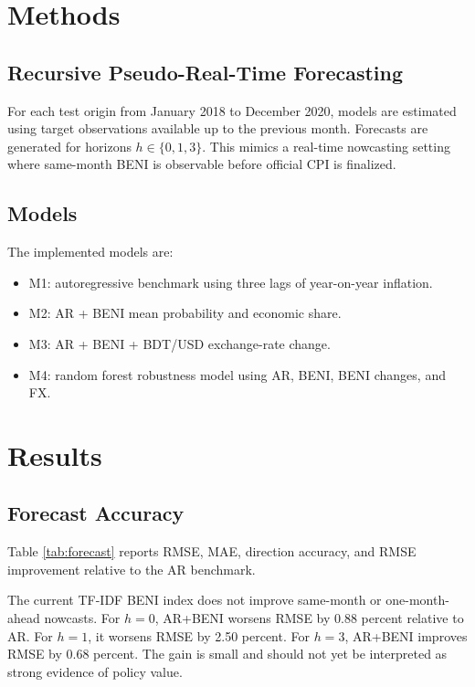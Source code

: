 \documentclass[11pt]{article}
\begin{document}
\section{Methods}

\subsection{Recursive Pseudo-Real-Time Forecasting}

For each test origin from January 2018 to December 2020, models are estimated using target observations available up to the previous month. Forecasts are generated for horizons $h \in \{0,1,3\}$. This mimics a real-time nowcasting setting where same-month BENI is observable before official CPI is finalized.

\subsection{Models}

The implemented models are:

\begin{itemize}
  \item M1: autoregressive benchmark using three lags of year-on-year inflation.
  \item M2: AR + BENI mean probability and economic share.
  \item M3: AR + BENI + BDT/USD exchange-rate change.
  \item M4: random forest robustness model using AR, BENI, BENI changes, and FX.
\end{itemize}

\section{Results}

\subsection{Forecast Accuracy}

Table \ref{tab:forecast} reports RMSE, MAE, direction accuracy, and RMSE improvement relative to the AR benchmark.

\begin{table}[ht]
\centering
\caption{Recursive pseudo-real-time forecast performance}
\label{tab:forecast}

\end{table}

The current TF-IDF BENI index does not improve same-month or one-month-ahead nowcasts. For $h=0$, AR+BENI worsens RMSE by 0.88 percent relative to AR. For $h=1$, it worsens RMSE by 2.50 percent. For $h=3$, AR+BENI improves RMSE by 0.68 percent. The gain is small and should not yet be interpreted as strong evidence of policy value.
\end{document}
